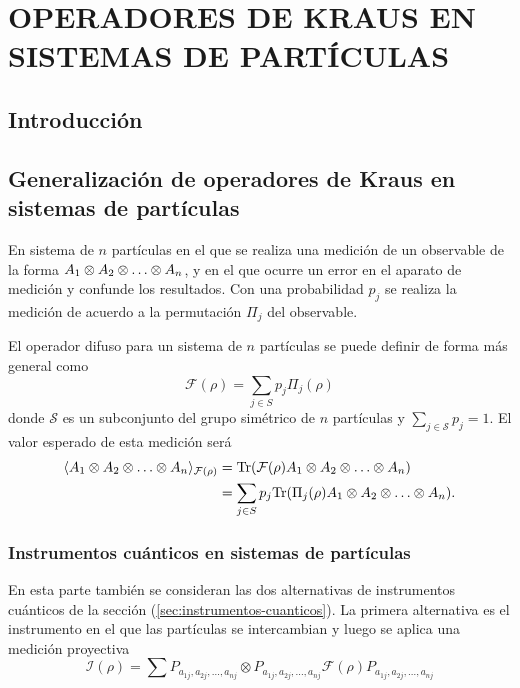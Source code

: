 \chapter{ OPERADORES DE KRAUS EN SISTEMAS DE \texorpdfstring{}{n} PARTÍCULAS}
\section{ Introducción}

















\section{Generalización de operadores de Kraus en sistemas de \texorpdfstring{}{n} partículas}

En sistema de $n$ partículas en el que se realiza una medición de un observable de la forma $A_1\otimes A_2\otimes \hdots \otimes A_n$, y en el que ocurre un error en el aparato de medición y confunde los resultados. Con una probabilidad $p_{j}$ se realiza la medición de acuerdo a la permutación $\Pi_j$ del observable. 

El operador difuso para un sistema de $n$ partículas se puede definir de forma más general como\begin{equation}\label{eq:fm-nparticles}
    \mathcal{F}(\rho)=\sum_{j \in S}p_{j}\Pi_j(\rho)
\end{equation}donde $\mathcal{S}$ es un subconjunto del grupo simétrico de $n$ partículas y $\sum_{j \in \mathcal{S}} p_j=1$. El valor esperado de esta medición será {\cite{Pineda_2021}}\begin{equation}\label{eq:ExpectedValue-generalForm}\begin{split}
    \langle A_1\otimes A_2\otimes \hdots \otimes A_n\rangle_{\mathcal{F}(\rho)} &={\rm Tr}(\mathcal{F}(\rho)A_1\otimes A_2\otimes \hdots \otimes A_n)\\
    &=\sum_{j \in S}p_{j}{\rm Tr}(\Pi_j(\rho)A_1\otimes A_2\otimes \hdots \otimes A_n).
\end{split}
\end{equation} 



\subsection{Instrumentos cuánticos en sistemas de \texorpdfstring{}{n} partículas}
En esta parte también se consideran las dos alternativas de instrumentos cuánticos de la sección ({\ref{sec:instrumentos-cuanticos}}). La primera alternativa es el instrumento en el que las partículas se intercambian y luego se aplica una medición proyectiva \begin{equation}
    \mathcal{I}(\rho)=\sum_{}P_{a_{1j},a_{2j},\hdots, a_{nj}}\otimes P_{a_{1j},a_{2j},\hdots, a_{nj}}\mathcal{F}(\rho)P_{a_{1j},a_{2j},\hdots, a_{nj}}
\end{equation}


